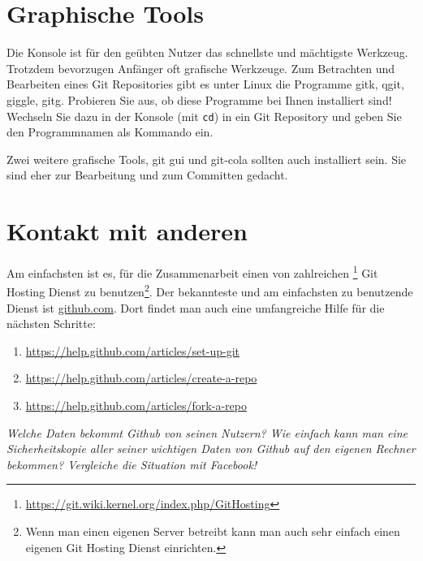 \documentclass[11pt,a4paper,twoside]{scrartcl}
\begin{document}
\section{Graphische Tools}

Die Konsole ist für den geübten Nutzer das schnellste und mächtigste
Werkzeug. Trotzdem bevorzugen Anfänger oft grafische Werkzeuge. Zum Betrachten
und Bearbeiten eines Git Repositories gibt es unter Linux die Programme gitk,
qgit, giggle, gitg. Probieren Sie aus, ob diese Programme bei Ihnen
installiert sind! Wechseln Sie dazu in der Konsole (mit \lstinline{cd}) in ein
Git Repository und geben Sie den Programmnamen als Kommando ein.

Zwei weitere grafische Tools, git gui und git-cola sollten auch installiert
sein. Sie sind eher zur Bearbeitung und zum Committen gedacht.

\section{Kontakt mit anderen}

Am einfachsten ist es, für die Zusammenarbeit einen von zahlreichen
\footnote{\url{https://git.wiki.kernel.org/index.php/GitHosting}} Git Hosting
Dienst zu benutzen\footnote{Wenn man einen eigenen Server betreibt kann man
auch sehr einfach einen eigenen Git Hosting Dienst einrichten.}. Der
bekannteste und am einfachsten zu benutzende Dienst ist \url{github.com}. Dort
findet man auch eine umfangreiche Hilfe für die nächsten Schritte:

\begin{enumerate}
  \item \url{https://help.github.com/articles/set-up-git}
  \item \url{https://help.github.com/articles/create-a-repo}
  \item \url{https://help.github.com/articles/fork-a-repo}
\end{enumerate}

\emph{Welche Daten bekommt Github von seinen Nutzern? Wie einfach kann man eine
Sicherheitskopie aller seiner wichtigen Daten von Github auf den eigenen
Rechner bekommen? Vergleiche die Situation mit Facebook!}
\end{document}
